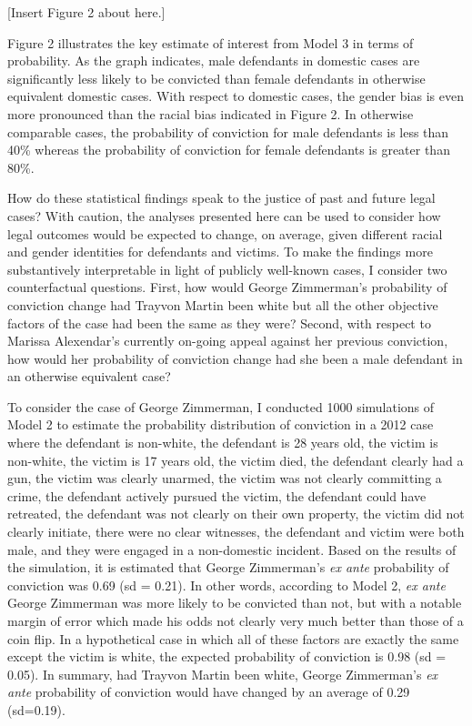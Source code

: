 \documentclass[12pt,article]{article}
\begin{document}
\begin{center}[Insert Figure 2 about here.]\end{center}

Figure 2 illustrates the key estimate of interest from Model 3 in terms
of probability. As the graph indicates, male defendants in domestic
cases are significantly less likely to be convicted than female
defendants in otherwise equivalent domestic cases. With respect to
domestic cases, the gender bias is even more pronounced than the racial
bias indicated in Figure 2. In otherwise comparable cases, the
probability of conviction for male defendants is less than 40\% whereas
the probability of conviction for female defendants is greater than
80\%.

How do these statistical findings speak to the justice of past and
future legal cases? With caution, the analyses presented here can be
used to consider how legal outcomes would be expected to change, on
average, given different racial and gender identities for defendants and
victims. To make the findings more substantively interpretable in light
of publicly well-known cases, I consider two counterfactual questions.
First, how would George Zimmerman's probability of conviction change had
Trayvon Martin been white but all the other objective factors of
the case had been the same as they were? Second, with respect to Marissa
Alexendar's currently on-going appeal against her previous conviction,
how would her probability of conviction change had she been a male
defendant in an otherwise equivalent case?

To consider the case of George Zimmerman, I conducted 1000 simulations
of Model 2 to estimate the probability distribution of conviction in a
2012 case where the defendant is non-white, the defendant is 28 years
old, the victim is non-white, the victim is 17 years old, the victim
died, the defendant clearly had a gun, the victim was clearly unarmed,
the victim was not clearly committing a crime, the defendant actively
pursued the victim, the defendant could have retreated, the defendant
was not clearly on their own property, the victim did not clearly
initiate, there were no clear witnesses, the defendant and victim were
both male, and they were engaged in a non-domestic incident. Based on
the results of the simulation, it is estimated that George Zimmerman's
\emph{ex ante} probability of conviction was 0.69 (sd = 0.21). In other
words, according to Model 2, \emph{ex ante} George Zimmerman was more
likely to be convicted than not, but with a notable margin of error
which made his odds not clearly very much better than those of a coin
flip. In a hypothetical case in which all of these factors are exactly
the same except the victim is white, the expected probability of
conviction is 0.98 (sd = 0.05). In summary, had Trayvon Martin been
white, George Zimmerman's \emph{ex ante} probability of conviction would
have changed by an average of 0.29 (sd=0.19).
\end{document}
